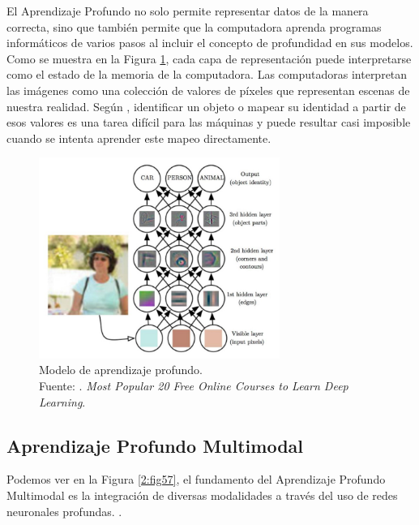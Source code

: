 El Aprendizaje Profundo no solo permite representar datos de la manera correcta, sino que también permite que la computadora aprenda programas informáticos de varios pasos al incluir el concepto de profundidad en sus modelos. Como se muestra en la Figura \ref{2:fig56}, cada capa de representación puede interpretarse como el estado de la memoria de la computadora. Las computadoras interpretan las imágenes como una colección de valores de píxeles que representan escenas de nuestra realidad. Según \parencite{tec_cook2018deeplearning}, identificar un objeto o mapear su identidad a partir de esos valores es una tarea difícil para las máquinas y puede resultar casi imposible cuando se intenta aprender este mapeo directamente.

\begin{figure}[!ht]
	\begin{center}
		\includegraphics[width=0.70\textwidth]{2/figures/deeplearning_machinelearning2.jpg}
		\caption[Modelo de aprendizaje profundo]{Modelo de aprendizaje profundo.\\
		Fuente: \cite{tec_cook2018deeplearning}. \textit{Most Popular 20 Free Online Courses to Learn Deep Learning}.}
		\label{2:fig56}
	\end{center}
\end{figure}


\subsection{Aprendizaje Profundo Multimodal}
Podemos ver en la Figura \ref{2:fig57}, el fundamento del Aprendizaje Profundo Multimodal es la integración de diversas modalidades a través del uso de redes neuronales profundas. \parencite{bk_deng2018deeplearningnlp}.

